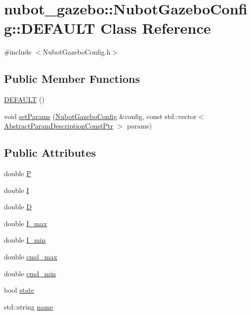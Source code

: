 \hypertarget{classnubot__gazebo_1_1NubotGazeboConfig_1_1DEFAULT}{\section{nubot\-\_\-gazebo\-:\-:Nubot\-Gazebo\-Config\-:\-:D\-E\-F\-A\-U\-L\-T Class Reference}
\label{classnubot__gazebo_1_1NubotGazeboConfig_1_1DEFAULT}
}


{\ttfamily \#include $<$Nubot\-Gazebo\-Config.\-h$>$}

\subsection*{Public Member Functions}
\begin{DoxyCompactItemize}
\item 
\hyperlink{classnubot__gazebo_1_1NubotGazeboConfig_1_1DEFAULT_ad15101e5f47d644bbdd9f57b3e22502d}{D\-E\-F\-A\-U\-L\-T} ()
\item 
void \hyperlink{classnubot__gazebo_1_1NubotGazeboConfig_1_1DEFAULT_afab49051355fe91978c0fdb94bd6f9cf}{set\-Params} (\hyperlink{classnubot__gazebo_1_1NubotGazeboConfig}{Nubot\-Gazebo\-Config} \&config, const std\-::vector$<$ \hyperlink{classnubot__gazebo_1_1NubotGazeboConfig_a25b01b079fefa04f8d43df7d664dedac}{Abstract\-Param\-Description\-Const\-Ptr} $>$ params)
\end{DoxyCompactItemize}
\subsection*{Public Attributes}
\begin{DoxyCompactItemize}
\item 
double \hyperlink{classnubot__gazebo_1_1NubotGazeboConfig_1_1DEFAULT_ae3e458c525777318e5b3ff815f5b5c6b}{P}
\item 
double \hyperlink{classnubot__gazebo_1_1NubotGazeboConfig_1_1DEFAULT_a4d2793c89212e6dd177512c483b84067}{I}
\item 
double \hyperlink{classnubot__gazebo_1_1NubotGazeboConfig_1_1DEFAULT_a6b329295cfa44d2f5531c6fe2ac01ca5}{D}
\item 
double \hyperlink{classnubot__gazebo_1_1NubotGazeboConfig_1_1DEFAULT_a4a98affd68a0cf46a838a835043f17a4}{I\-\_\-max}
\item 
double \hyperlink{classnubot__gazebo_1_1NubotGazeboConfig_1_1DEFAULT_ac96053479b63899eacfab157e25390bc}{I\-\_\-min}
\item 
double \hyperlink{classnubot__gazebo_1_1NubotGazeboConfig_1_1DEFAULT_a7ee4a83fa6aa2600bb74c33e5d423be8}{cmd\-\_\-max}
\item 
double \hyperlink{classnubot__gazebo_1_1NubotGazeboConfig_1_1DEFAULT_a41e69b0f178c92ddc18458b6eb633275}{cmd\-\_\-min}
\item 
bool \hyperlink{classnubot__gazebo_1_1NubotGazeboConfig_1_1DEFAULT_aa38af30ac9af7554674a52143f5a38bd}{state}
\item 
std\-::string \hyperlink{classnubot__gazebo_1_1NubotGazeboConfig_1_1DEFAULT_a8d036345ef726f3e62de12e88055c0a5}{name}
\end{DoxyCompactItemize}


